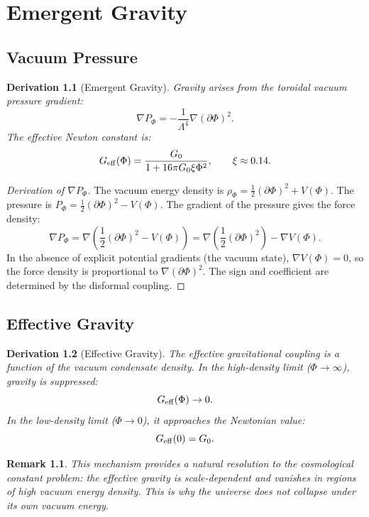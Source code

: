 \documentclass[12pt,oneside]{book}
\newtheorem{derivation}{Derivation}[chapter]
\newtheorem{remark}{Remark}[chapter]
\begin{document}
\chapter{Emergent Gravity}

\section{Vacuum Pressure}

\begin{derivation}[Emergent Gravity]
Gravity arises from the toroidal vacuum pressure gradient:
\[
\nabla P_\Phi = -\frac{1}{\Lambda^4} \nabla(\partial\Phi)^2.
\]
The effective Newton constant is:
\[
G_{\rm eff}(\Phi) = \frac{G_0}{1 + 16\pi G_0 \xi \Phi^2}, \qquad \xi \approx 0.14.
\]
\end{derivation}

\begin{proof}[Derivation of $\nabla P_\Phi$]
The vacuum energy density is $\rho_\Phi = \frac{1}{2}(\partial\Phi)^2 + V(\Phi)$. The pressure is $P_\Phi = \frac{1}{2}(\partial\Phi)^2 - V(\Phi)$. The gradient of the pressure gives the force density:
\[
\nabla P_\Phi = \nabla\left(\frac{1}{2}(\partial\Phi)^2 - V(\Phi)\right) = \nabla\left(\frac{1}{2}(\partial\Phi)^2\right) - \nabla V(\Phi).
\]
In the absence of explicit potential gradients (the vacuum state), $\nabla V(\Phi) = 0$, so the force density is proportional to $\nabla(\partial\Phi)^2$. The sign and coefficient are determined by the disformal coupling.
\end{proof}

\section{Effective Gravity}

\begin{derivation}[Effective Gravity]
The effective gravitational coupling is a function of the vacuum condensate density. In the high-density limit ($\Phi \to \infty$), gravity is suppressed:
\[
G_{\rm eff}(\Phi) \to 0.
\]
In the low-density limit ($\Phi \to 0$), it approaches the Newtonian value:
\[
G_{\rm eff}(0) = G_0.
\]
\end{derivation}

\begin{remark}
This mechanism provides a natural resolution to the cosmological constant problem: the effective gravity is scale-dependent and vanishes in regions of high vacuum energy density. This is why the universe does not collapse under its own vacuum energy.
\end{remark}
\end{document}
